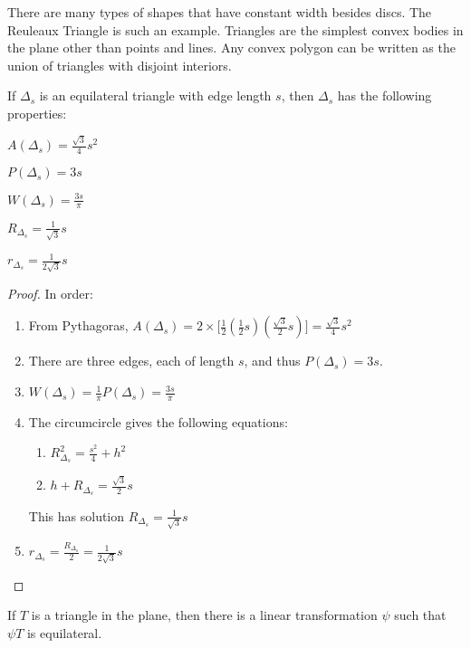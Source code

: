         There are many types of shapes that have constant width besides discs. The Reuleaux Triangle is such an example.
        Triangles are the simplest convex bodies in the plane other than points and lines. Any convex polygon can be written as the union of triangles with disjoint interiors. 
        \begin{theorem}
        If $\Delta_s$ is an equilateral triangle with edge length $s$, then $\Delta_s$ has the following properties:
        \begin{enumerate}
        \begin{multicols}{5}
        \item $A(\Delta_s) = \frac{\sqrt{3}}{4}s^2$
        \item $P(\Delta_s) = 3s$
        \item $W(\Delta_s) = \frac{3s}{\pi}$
        \item $R_{\Delta_s} = \frac{1}{\sqrt{3}}s$
        \item $r_{\Delta_s} = \frac{1}{2\sqrt{3}}s$
        \end{multicols}
        \end{enumerate}
        \end{theorem}
        \begin{proof}
        In order:
        \begin{enumerate}
            \item From Pythagoras, $A(\Delta_s) =2\times\big[\frac{1}{2}(\frac{1}{2}s)(\frac{\sqrt{3}}{2}s)\big] = \frac{\sqrt{3}}{4}s^2$
            \item There are three edges, each of length $s$, and thus $P(\Delta_s) = 3s$.
            \item $W(\Delta_s) = \frac{1}{\pi}P(\Delta_s) = \frac{3s}{\pi}$
            \item The circumcircle gives the following equations:
            \begin{enumerate}
                \item $R_{\Delta_s}^2=\frac{s^2}{4}+h^2$
                \item $h+R_{\Delta_s} = \frac{\sqrt{3}}{2}s$
            \end{enumerate}
            This has solution $R_{\Delta_s}=\frac{1}{\sqrt{3}}s$
            \item $r_{\Delta_s} = \frac{R_{\Delta_s}}{2}= \frac{1}{2\sqrt{3}}s$
        \end{enumerate}
        \end{proof}
        \begin{theorem}
        If $T$ is a triangle in the plane, then there is a linear transformation $\psi$ such that $\psi T$ is equilateral.
        \end{theorem}
